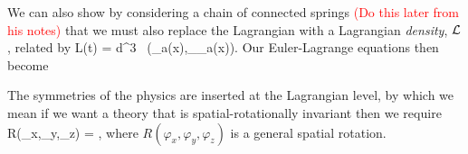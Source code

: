We can also show by considering a chain of connected springs \textcolor{red}{(Do this later from his notes)} that we must also replace the Lagrangian with a Lagrangian \textit{density}, $\mathcal{L}$, related by 
\be 
\label{eqn:LtocL}
    L(t) = \int d^3 \, \cL\big(\phi_a(x),\p_{\mu}\phi_a(x)\big).
\ee 
Our Euler-Lagrange equations then become

The symmetries of the physics are inserted at the Lagrangian level, by which we mean if we want a theory that is spatial-rotationally invariant then we require 
\bse 
    R(\varphi_x,\varphi_y,\varphi_z) \cL = \cL,
\ese
where $R(\varphi_x,\varphi_y,\varphi_z)$ is a general spatial rotation. 

